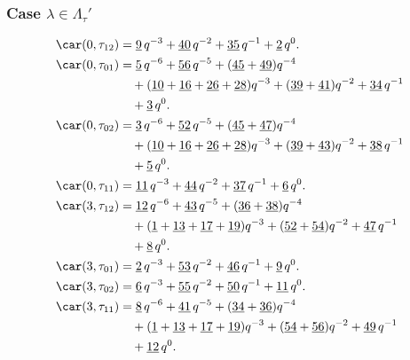 
\subsubsection{Case $\lambda\in \Lambda_\tau'$}

\begin{align*}
	\car(0,\tau_{12})
	&=\underline{9}\,q^{-3}+\underline{40}\,q^{-2}+\underline{35}\,q^{-1}+\underline{2}\,q^0.\\
	\car(0,\tau_{01})
	&=\underline{5}\,q^{-6}+\underline{56}\,q^{-5}+(\underline{45}+\underline{49})q^{-4}\\
	&\quad+(\underline{10}+\underline{16}+\underline{26}+\underline{28})q^{-3}+(\underline{39}+\underline{41})q^{-2}+\underline{34}\,q^{-1}\\
	&\quad+\underline{3}\,q^0.\\
	\car(0,\tau_{02})
	&=\underline{3}\,q^{-6}+\underline{52}\,q^{-5}+(\underline{45}+\underline{47})q^{-4}\\
	&\quad+(\underline{10}+\underline{16}+\underline{26}+\underline{28})q^{-3}+(\underline{39}+\underline{43})q^{-2}+\underline{38}\,q^{-1}\\
	&\quad+\underline{5}\,q^0.\\
	\car(0,\tau_{11})
	&=\underline{11}\,q^{-3}+\underline{44}\,q^{-2}+\underline{37}\,q^{-1}+\underline{6}\,q^0.\\
	\car(3,\tau_{12})
	&=\underline{12}\,q^{-6}+\underline{43}\,q^{-5}+(\underline{36}+\underline{38})q^{-4}\\
	&\quad+(\underline{1}+\underline{13}+\underline{17}+\underline{19})q^{-3}+(\underline{52}+\underline{54})q^{-2}+\underline{47}\,q^{-1}\\
	&\quad+\underline{8}\,q^0.\\
	\car(3,\tau_{01})
	&=\underline{2}\,q^{-3}+\underline{53}\,q^{-2}+\underline{46}\,q^{-1}+\underline{9}\,q^0.\\
	\car(3,\tau_{02})
	&=\underline{6}\,q^{-3}+\underline{55}\,q^{-2}+\underline{50}\,q^{-1}+\underline{11}\,q^0.\\
	\car(3,\tau_{11})
	&=\underline{8}\,q^{-6}+\underline{41}\,q^{-5}+(\underline{34}+\underline{36})q^{-4}\\
	&\quad+(\underline{1}+\underline{13}+\underline{17}+\underline{19})q^{-3}+(\underline{54}+\underline{56})q^{-2}+\underline{49}\,q^{-1}\\
	&\quad+\underline{12}\,q^0.
\end{align*}

